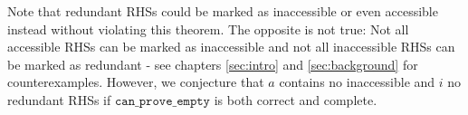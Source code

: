 Note that redundant RHSs could be marked as inaccessible or even accessible instead without violating this theorem.
The opposite is not true: Not all accessible RHSs can be marked as inaccessible and not all inaccessible RHSs can be marked as redundant - see chapters \ref{sec:intro} and \ref{sec:background} for counterexamples. However, we conjecture that $a$ contains no inaccessible and $i$ no redundant RHSs if $\mathtt{can\_prove\_empty}$ is both correct and complete.